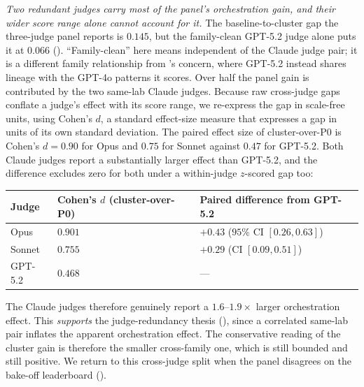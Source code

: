 \documentclass[11pt]{article}
\begin{document}
\emph{Two redundant judges carry most of the panel's orchestration gain, and their wider
score range alone cannot account for it.} The baseline-to-cluster gap the three-judge
panel reports is $0.145$, but the family-clean GPT-5.2 judge alone puts it at $0.066$
(). ``Family-clean'' here means independent of the Claude judge pair;
it is a different family relationship from 's concern, where GPT-5.2 instead
shares lineage with the GPT-4o patterns it scores. Over half the panel gain is contributed by the two same-lab
Claude judges. Because raw cross-judge gaps
conflate a judge's effect with its score range, we re-express the gap in scale-free
units, using Cohen's $d$, a standard effect-size measure that expresses a gap in units of its
own standard deviation. The paired effect size of
cluster-over-P0 is Cohen's $d=0.90$ for Opus and $0.75$ for Sonnet against $0.47$ for GPT-5.2.
Both Claude judges report a substantially larger effect than
GPT-5.2, and the difference excludes zero for both under a within-judge $z$-scored gap too:
\begin{center}
\begin{tabular}{lll}
\toprule
Judge & Cohen's $d$ (cluster-over-P0) & Paired difference from GPT-5.2 \\
\midrule
Opus & $0.901$ & $+0.43$ ($95\%$ CI $[0.26, 0.63]$) \\
Sonnet & $0.755$ & $+0.29$ (CI $[0.09, 0.51]$) \\
GPT-5.2 & $0.468$ & --- \\
\bottomrule
\end{tabular}
\end{center}
The Claude judges therefore
genuinely report a $1.6$--$1.9\times$ larger orchestration effect. This \emph{supports} the
judge-redundancy thesis (), since a correlated same-lab pair inflates
the apparent orchestration effect. The conservative reading of the cluster gain is
therefore the smaller cross-family one, which is still bounded and still positive. We
return to this cross-judge split when the panel disagrees on the bake-off leaderboard
().
\end{document}
